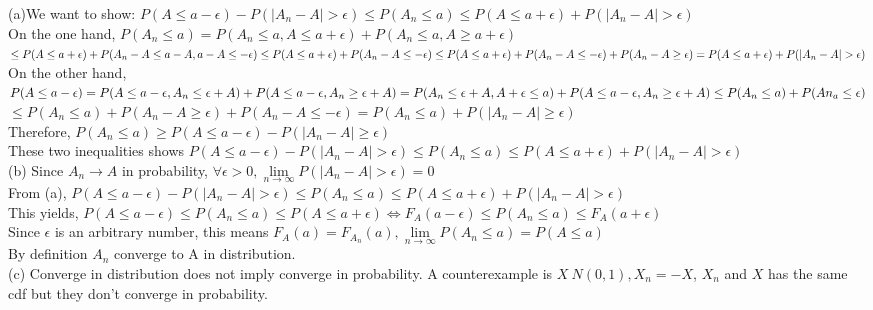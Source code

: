 \documentclass[11pt]{article}
\newenvironment{question}[2][Question]{\begin{trivlist}
\item[\hskip \labelsep {\bfseries #1}\hskip \labelsep {\bfseries #2.}]}{\end{trivlist}}
\begin{document}
\begin{question}{3}
\end{question}
(a)We want to show: $P(A\leq a- \epsilon) - P(|A_n - A |> \epsilon) \leq P(A_n \leq a ) \leq P(A\leq a+ \epsilon) + P(|A_n - A| > \epsilon)$\\
On the one hand, $P(A_n \leq a) = P(A_n \leq a,A\leq a+\epsilon)+P(A_n \leq a, A \geq a+\epsilon)$\\
$\leq P(A \leq a+ \epsilon) + P(A_n - A \leq a- A, a -A \leq -\epsilon) \leq P(A \leq a+ \epsilon)  + P(A_n -A \leq -\epsilon)\\ \leq P(A \leq a+ \epsilon) + P(A_n -A \leq -\epsilon)  + P(A_n -A \geq \epsilon) = P(A\leq a+ \epsilon) + P(|A_n - A| > \epsilon)$\\
On the other hand, $P(A\leq a - \epsilon) = P(A\leq a - \epsilon ,A_n \leq \epsilon +A )+ P(A\leq a - \epsilon ,A_n \geq \epsilon +A ) \\
= P(A_n\leq \epsilon+A, A+\epsilon \leq a) +   P(A\leq a - \epsilon ,A_n \geq \epsilon +A ) \leq P(A_n \leq a)+ P(An_a \leq \epsilon)$\\
$\leq  P(A_n \leq a)+ P(A_n-A \geq \epsilon) + P(A_n -A\leq -\epsilon) = P(A_n \leq a )+ P(|A_n -A |\geq \epsilon)$\\
Therefore, $P(A_n \leq a) \geq P(A\leq a - \epsilon) - P(|A_n -A |\geq \epsilon) $\\
These two inequalities shows $P(A\leq a- \epsilon) - P(|A_n - A |> \epsilon) \leq P(A_n \leq a ) \leq P(A\leq a+ \epsilon) + P(|A_n - A| > \epsilon)$\\

(b) Since $A_n \to A$ in probability, $\forall \epsilon > 0, \lim\limits_{n \to \infty } P(|A_n-A| >\epsilon ) = 0$\\
From (a), $P(A\leq a- \epsilon) - P(|A_n - A |> \epsilon)\leq P(A_n \leq a)  \leq P(A\leq a+ \epsilon) + P(|A_n - A| > \epsilon)$\\
This yields, $P(A\leq a- \epsilon) \leq P(A_n \leq a)  \leq P(A\leq a+\epsilon) \Longleftrightarrow F_A(a- \epsilon) \leq P(A_n \leq a) \leq F_A(a+\epsilon) $  \\
Since $\epsilon$ is an arbitrary number, this means $F_A(a) = F_{A_n}(a), \lim\limits_{n \to \infty} P(A_n\leq a) = P(A \leq a)$\\
By definition $A_n$ converge to A in distribution.\\

(c) Converge in distribution does not imply converge in probability. A counterexample is $X ~ N(0,1), X_n = -X$, $X_n $ and $X$ has the same cdf but they don't converge in probability.    
\end{document}
